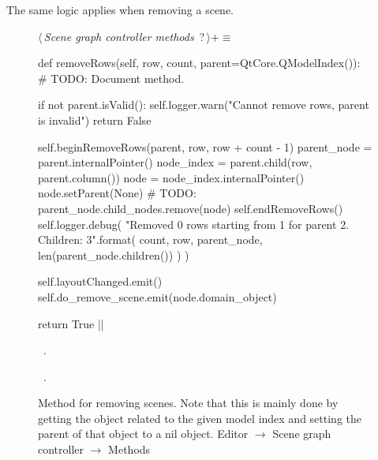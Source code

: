 \documentclass[%
    a4paper,    %
    justified,  %
    nobib,      %
    openany     %
]{tufte-book}
\makeatletter
\renewcommand{\label}[1]{\@tufte@label{##1}}%
\makeatother
\begin{document}
The same logic applies when removing a scene.

\begin{figure}
\begin{flushleft} \small
\begin{minipage}{\linewidth}\label{scrap52}\raggedright\small
{} $\langle\,${\itshape Scene graph controller methods}\nobreak\ {\footnotesize {?}}$\,\rangle+\equiv$
\vspace{-1ex}
\begin{pythoncode}
def removeRows(self, row, count, parent=QtCore.QModelIndex()):
    # TODO: Document method.

    if not parent.isValid():
        self.logger.warn("Cannot remove rows, parent is invalid")
        return False

    self.beginRemoveRows(parent, row, row + count - 1)
    parent_node = parent.internalPointer()
    node_index = parent.child(row, parent.column())
    node       = node_index.internalPointer()
    node.setParent(None)
    # TODO: parent_node.child_nodes.remove(node)
    self.endRemoveRows()
    self.logger.debug(
        "Removed {0} rows starting from {1} for parent {2}. Children: {3}".format(
            count, row, parent_node, len(parent_node.children())
        )
    )

    self.layoutChanged.emit()
    self.do_remove_scene.emit(node.domain_object)

    return True
|\NWsep|
\end{pythoncode}
\vspace{1.5ex}
\footnotesize
\begin{list}{}{\setlength{\itemsep}{-\parsep}\setlength{\itemindent}{-\leftmargin}}
\item \NWtxtMacroDefBy\ .
\item \NWtxtMacroRefIn\ .

\item{}
\end{list}
\end{minipage}\vspace{4ex}
\end{flushleft}
\caption{Method for removing scenes. Note that this is mainly done by getting
  the object related to the given model index and setting the parent of that
  object to a nil object.
  \newline{}\newline{}Editor $\rightarrow$ Scene graph controller
  $\rightarrow$ Methods}
\label{editor:lst:scene-graph-controller:methods:remove-rows}
\end{figure}
\end{document}
